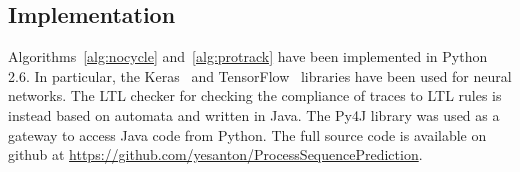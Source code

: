 



\subsection{Implementation}
\label{ssec:implementation}
Algorithms~\ref{alg:nocycle} and~\ref{alg:protrack} have been implemented in Python 2.6. In particular, the Keras~\cite{chollet2015keras} and TensorFlow~\cite{tensorflow2015-whitepaper} libraries have been used for neural networks. The LTL checker for checking the compliance of traces to LTL rules is instead based on automata and written in Java. The Py4J library was used as a gateway to access Java code from Python.
The full source code is available on github at \url{https://github.com/yesanton/ProcessSequencePrediction}.


